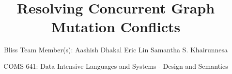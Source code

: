 \documentclass[hyperref={pdfpagelabels=false}]{beamer}
\title[641 Project]{Resolving Concurrent Graph Mutation Conflicts}
\author[Team Bliss]{Bliss
\linebreak Team Member(s):
\linebreak Aashish Dhakal
\linebreak Eric Lin
\linebreak Samantha S. Khairunnesa}
\institute[ISU]{Department of Computer Science \linebreak Iowa State
University}
\date[COMS 641]{COMS 641: Data Intensive Languages and Systems - Design and Semantics}
\begin{document}
  \begin{frame}[plain]
    \titlepage
  \end{frame}
  
  
  
  
  
  
\end{document}
